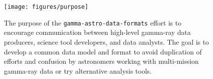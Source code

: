 \begin{figure}[tb]
\centerline{\texttt{[image: figures/purpose]}}
\caption{
The purpose of the \texttt{gamma-astro-data-formats} effort is to encourage communication between high-level gamma-ray data producers, science tool developers, and data analysts. The goal is to develop a common data model and format to avoid duplication of efforts and confusion by astronomers working with multi-mission gamma-ray data or try alternative analysis tools.
}
\label{fig:purpose}
\end{figure}
